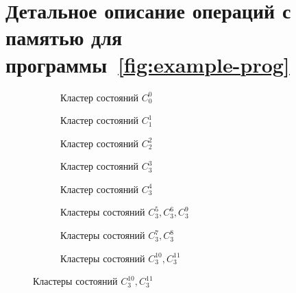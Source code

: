 \chapter{Детальное описание операций с памятью для
программы~\ref{fig:example-prog}}\label{app:A}







\clearpage

\begin{figure}[H]
  \begin{subfigure}{0.19\textwidth}
    \centering
    
    \caption{Кластер состояний $C_{0}^{0}$}
    \label{fig:cluster-0}
  \end{subfigure}
  \hfill
  \begin{subfigure}{0.19\textwidth}
    \centering
    
    \caption{Кластер состояний $C_{1}^{1}$}
    \label{fig:cluster-1}
  \end{subfigure}
  \hfill
  \begin{subfigure}{0.19\textwidth}
    \centering
    
    \caption{Кластер состояний $C_{2}^{2}$}
    \label{fig:cluster-2}
  \end{subfigure}
  \hfill
  \begin{subfigure}{0.19\textwidth}
    \centering
    
    \caption{Кластер состояний $C_{3}^{3}$}
    \label{fig:cluster-3}
  \end{subfigure}
  \hfill
  \begin{subfigure}{0.19\textwidth}
    \centering
    
    \caption{Кластер состояний $C_{3}^{4}$}
    \label{fig:cluster-4}
  \end{subfigure}

  \vspace{5mm}

  \begin{subfigure}{0.3\textwidth}
    \centerfloat{}
    \caption{Кластеры состояний $C_{3}^{5}, C_{3}^{6}, C_{3}^{9}$}
    \label{fig:cluster-5-6-9}
  \end{subfigure}
  \hfill
  \begin{subfigure}{0.3\textwidth}
    \centerfloat{}
    \caption{Кластеры состояний $C_{3}^{7}, C_{3}^{8}$}
    \label{fig:cluster-7-8}
  \end{subfigure}
  \hfill
  \begin{subfigure}{0.3\textwidth}
    \centerfloat{}
    \caption{Кластеры состояний $C_{3}^{10}, C_{3}^{11}$}
    \label{fig:cluster-10-11}
  \end{subfigure}


\end{figure}
